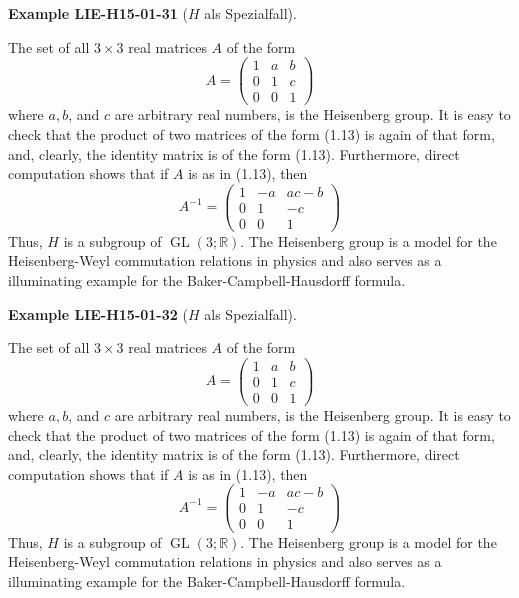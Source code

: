 \documentclass[10pt, letterpaper]{article}
\newcommand{\CustomHeading}[3]{%
  \par\medskip\noindent%
  \textbf{#1 #2} \textnormal{(#3)}.\enskip%
}
\newenvironment{EXA}[2]{\CustomHeading{Example}{#1}{#2}}{}
\begin{document}
\begin{EXA}{LIE-H15-01-31}{$H$ als Spezialfall}
The set of all $3 \times 3$ real matrices $A$ of the form
$$
A=\left(\begin{array}{lll}
1 & a & b \\
0 & 1 & c \\
0 & 0 & 1
\end{array}\right)
$$
where $a, b$, and $c$ are arbitrary real numbers, is the Heisenberg group. It is easy to check that the product of two matrices of the form (1.13) is again of that form, and, clearly, the identity matrix is of the form (1.13). Furthermore, direct computation shows that if $A$ is as in (1.13), then
$$
A^{-1}=\left(\begin{array}{ccc}
1 & -a & a c-b \\
0 & 1 & -c \\
0 & 0 & 1
\end{array}\right)
$$
Thus, $H$ is a subgroup of $\operatorname{GL}(3 ; \mathbb{R})$. The Heisenberg group is a model for the Heisenberg-Weyl commutation relations in physics and also serves as a illuminating example for the Baker-Campbell-Hausdorff formula.
\end{EXA}

\begin{EXA}{LIE-H15-01-32}{$H$ als Spezialfall}
The set of all $3 \times 3$ real matrices $A$ of the form
$$
A=\left(\begin{array}{lll}
1 & a & b \\
0 & 1 & c \\
0 & 0 & 1
\end{array}\right)
$$
where $a, b$, and $c$ are arbitrary real numbers, is the Heisenberg group. It is easy to check that the product of two matrices of the form (1.13) is again of that form, and, clearly, the identity matrix is of the form (1.13). Furthermore, direct computation shows that if $A$ is as in (1.13), then
$$
A^{-1}=\left(\begin{array}{ccc}
1 & -a & a c-b \\
0 & 1 & -c \\
0 & 0 & 1
\end{array}\right)
$$
Thus, $H$ is a subgroup of $\operatorname{GL}(3 ; \mathbb{R})$. The Heisenberg group is a model for the Heisenberg-Weyl commutation relations in physics and also serves as a illuminating example for the Baker-Campbell-Hausdorff formula.
\end{EXA}
\end{document}
